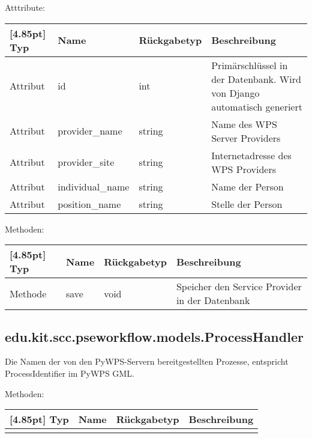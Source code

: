			Atttribute:
			\begin{center}
				\setlength\tabcolsep{5pt}
				\renewcommand{\arraystretch}{1.5}
				
				\begin{tabularx}{\textwidth}{|l|l|l|X|}
					\hline
					\rowcolor[gray]{0.75}[4.85pt]
					Typ & Name & Rückgabetyp & Beschreibung \\ \hline 
					Attribut & id & int & Primärschlüssel in der Datenbank. Wird von Django automatisch generiert \\ \hline
					Attribut & provider\_name & string & Name des WPS Server Providers\\ \hline
					Attribut & provider\_site & string & Internetadresse des WPS Providers \\ \hline
					Attribut & individual\_name & string & Name der Person\\ \hline
					Attribut & position\_name & string & Stelle der Person \\ \hline
				\end{tabularx}
			\end{center}
			
			Methoden:
			\begin{center}
				\setlength\tabcolsep{5pt}
				\renewcommand{\arraystretch}{1.5}
				
				\begin{tabularx}{\textwidth}{|l|l|l|X|}
					\hline
					\rowcolor[gray]{0.75}[4.85pt]
					Typ & Name & Rückgabetyp & Beschreibung \\ \hline 
					Methode & save & void & Speicher den Service Provider in der Datenbank \\
					\hline
				\end{tabularx}
			\end{center}
			
		\subsection{edu.kit.scc.pseworkflow.models.ProcessHandler}
			Die Namen der von den PyWPS-Servern bereitgestellten Prozesse, entspricht ProcessIdentifier im PyWPS GML.
			
			Methoden:
			\begin{center}
				\setlength\tabcolsep{5pt}
				\renewcommand{\arraystretch}{1.5}
				
				\begin{tabularx}{\textwidth}{|l|l|l|X|}
					\hline
					\rowcolor[gray]{0.75}[4.85pt]
					Typ & Name & Rückgabetyp & Beschreibung \\ \hline 
					&&& \\
					\hline
				\end{tabularx}
			\end{center}
			
